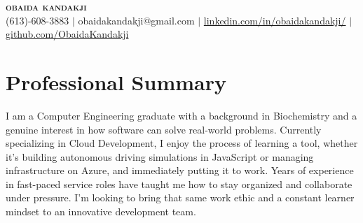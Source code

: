 \documentclass[letterpaper,10.5pt]{article}
\begin{document}

\begin{center}
    \textbf{\Huge \scshape obaida kandakji} \\ \vspace{1pt}
    \small (613)-608-3883 $|$ 
    {\small obaidakandakji@gmail.com} $|$ 
    {\small \href{https://linkedin.com/in/obaidakandakji/}{linkedin.com/in/obaidakandakji/}} $|$
    {\small \href{https://github.com/ObaidaKandakji}{github.com/ObaidaKandakji}}
\end{center}

\section{Professional Summary}
    \begin{itemize}[leftmargin=0.15in, label={}]
        \small{\item{I am a Computer Engineering graduate with a background in Biochemistry and a genuine interest in how software can solve real-world problems. Currently specializing in Cloud Development, I enjoy the process of learning a tool, whether it's building autonomous driving simulations in JavaScript or managing infrastructure on Azure, and immediately putting it to work. Years of experience in fast-paced service roles have taught me how to stay organized and collaborate under pressure. I'm looking to bring that same work ethic and a constant learner mindset to an innovative development team.}}
    \end{itemize}
\end{document}
